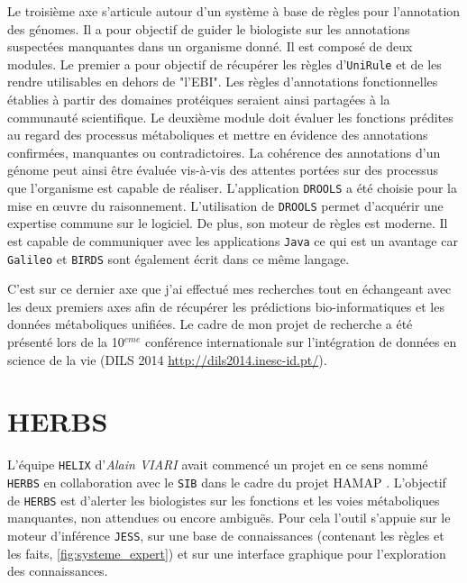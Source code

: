 \begin{refsegment}
Le troisième axe s'articule autour d'un système à base de règles pour l'annotation des génomes. Il a pour objectif de guider le biologiste sur les annotations suspectées manquantes dans un organisme donné. Il est composé de deux modules. Le premier a pour objectif de récupérer les règles d'\texttt{UniRule} et de les rendre utilisables en dehors de "l'\gls{EBI}". Les règles d'annotations fonctionnelles établies à partir des domaines protéiques seraient ainsi partagées à la communauté scientifique. Le deuxième module doit évaluer les fonctions prédites au regard des processus métaboliques et mettre en évidence des annotations confirmées, manquantes ou contradictoires. La cohérence des annotations d'un génome peut ainsi être évaluée vis-à-vis des attentes portées sur des processus que l'organisme est capable de réaliser. L'application \texttt{DROOLS} a été choisie pour la mise en œuvre du raisonnement. L'utilisation de  \texttt{DROOLS} permet d'acquérir une expertise commune sur le logiciel. De plus, son moteur de règles est moderne. Il est capable de communiquer avec les applications \texttt{Java} ce  qui est un avantage car \texttt{Galileo} et \texttt{BIRDS} sont également écrit dans ce même langage.

C'est sur ce dernier axe que j'ai effectué mes recherches tout en échangeant avec les deux premiers axes afin de récupérer les prédictions bio-informatiques et les données métaboliques unifiées. Le cadre de mon projet de recherche a été présenté lors de la 10$^{eme}$ conférence internationale sur l'intégration de données en science de la vie (DILS 2014 \url{http://dils2014.inesc-id.pt/}).



\section{HERBS}

L'équipe \texttt{HELIX} d'\textit{Alain VIARI} avait commencé un projet en ce sens nommé \texttt{\gls{HERBS}} en collaboration avec le \texttt{\gls{SIB}} dans le cadre du projet \gls{HAMAP} \cite{pedruzzi2015hamap}. L'objectif de \texttt{\gls{HERBS}} est d'alerter les biologistes sur les fonctions et les voies métaboliques manquantes, non attendues ou encore ambiguës. Pour cela l'outil s'appuie sur le moteur d'inférence \texttt{\gls{JESS}}, sur une base de connaissances (contenant les règles et les faits, \cref{fig:systeme_expert}) et sur une interface graphique pour l'exploration des connaissances. 


\end{refsegment}
